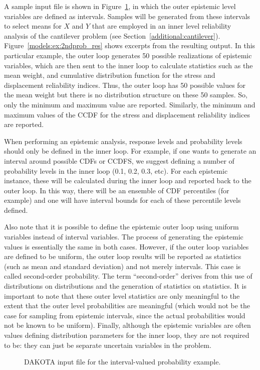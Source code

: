 A sample input file is shown in Figure~\ref{models:ex:2ndprob}, in
which the outer epistemic level variables are defined as intervals. 
Samples will be generated from these intervals to select means for
$X$ and $Y$ that are employed in an inner level reliability analysis
of the cantilever problem (see Section~\ref{additional:cantilever}).
Figure~\ref{models:ex:2ndprob_res} shows excerpts from the resulting
output.  In this particular example, the outer loop generates 50 
possible realizations of epistemic variables, which are then 
sent to the inner loop to calculate statistics such as 
the mean weight, 
and cumulative distribution function for the stress and displacement
reliability indices.  Thus, the outer loop has 50 possible values for the mean 
weight but there is no distribution structure on these 50 samples.  So, 
only the minimum and maximum value are reported.  Similarly, the 
minimum and maximum values of the CCDF for the stress and 
displacement reliability indices are reported. 

When performing an epistemic analysis, response levels and 
probability levels should only be defined in the inner loop. 
For example, if one wants to generate an interval around possible 
CDFs or CCDFS, we suggest defining a number of probability levels 
in the inner loop (0.1, 0.2, 0.3, etc).  For each epistemic instance, 
these will be calculated during the inner loop and reported back to the 
outer loop.  In this way, there will be an ensemble of CDF percentiles 
(for example) and one will have interval bounds for each of these 
percentile levels defined.  

Also note that it is possible to define the epistemic outer 
loop using uniform variables instead of interval variables.  The 
process of generating the epistemic values is essentially the 
same in both cases.  However, if the outer loop variables are 
defined to be uniform, the outer loop results will be reported as 
statistics (such as mean and standard deviation) and not merely intervals. 
This case is called second-order probability. 
The term ``second-order'' derives from this use of distributions on
distributions and the generation of statistics on statistics. 
It is important to note that these outer level
statistics are only meaningful to the extent that the outer level
probabilities are meaningful (which would not be the case for sampling
from epistemic intervals, since the actual probabilities would not be
known to be uniform).  Finally, although the epistemic variables are 
often values defining distribution parameters for the inner loop, 
they are not required to be: they can just be separate uncertain variables 
in the problem. 
\begin{figure}
  \centering
  \begin{bigbox}
    \begin{tiny}
    \end{tiny}
  \end{bigbox}
  \caption{DAKOTA input file for the interval-valued probability example.}
  \label{models:ex:2ndprob}
\end{figure}

